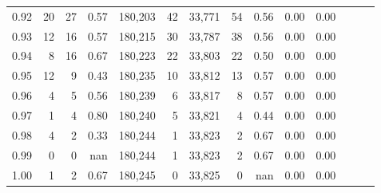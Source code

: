 \begin{tabular}{rrrrrrrrrrrrrr}
0.92 &     20 &     27 &  0.57 &  180,203 &       42 &  33,771 &      54 &  0.56 &  0.00 &      0.00 \\
0.93 &     12 &     16 &  0.57 &  180,215 &       30 &  33,787 &      38 &  0.56 &  0.00 &      0.00 \\
0.94 &      8 &     16 &  0.67 &  180,223 &       22 &  33,803 &      22 &  0.50 &  0.00 &      0.00 \\
0.95 &     12 &      9 &  0.43 &  180,235 &       10 &  33,812 &      13 &  0.57 &  0.00 &      0.00 \\
0.96 &      4 &      5 &  0.56 &  180,239 &        6 &  33,817 &       8 &  0.57 &  0.00 &      0.00 \\
0.97 &      1 &      4 &  0.80 &  180,240 &        5 &  33,821 &       4 &  0.44 &  0.00 &      0.00 \\
0.98 &      4 &      2 &  0.33 &  180,244 &        1 &  33,823 &       2 &  0.67 &  0.00 &      0.00 \\
0.99 &      0 &      0 &   nan &  180,244 &        1 &  33,823 &       2 &  0.67 &  0.00 &      0.00 \\
1.00 &      1 &      2 &  0.67 &  180,245 &        0 &  33,825 &       0 &   nan &  0.00 &      0.00 \\
\bottomrule
\end{tabular}
